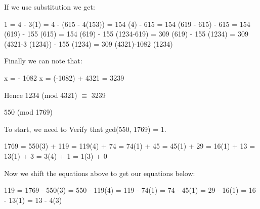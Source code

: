 \documentclass[12pt,letterpaper,final]{report}
\begin{document}
If we use substitution we get: \newline

1 = 4 - 3(1)   = 4 - (615 - 4(153))   =  154 (4) - 615  = 154 (619 - 615) - 615  = 154 (619) - 155 (615)  = 154 (619) - 155 (1234-619)  = 309 (619) - 155 (1234)  = 309 (4321-3 (1234)) - 155 (1234)  = 309 (4321)-1082 (1234) \newline

Finally we can note that: \newline

x = - 1082 \newline
x = (-1082) + 4321 = 3239 \newline


Hence  $1234$ (mod 4321) $\equiv$ 3239 \newline

\bigskip

$550$ (mod 1769)  \newline

To start, we need to Verify that gcd(550, 1769) = 1. \newline

1769 = 550(3) + 119  = 119(4) + 74	  = 74(1) + 45	  = 45(1) + 29	  = 16(1) + 13	  = 13(1) + 3	  = 3(4) + 1	  = 1(3) + 0 \newline

Now we shift the equations above to get our equations below: \newline

119 = 1769 - 550(3)  = 550 - 119(4)  = 119 - 74(1)  = 74 - 45(1)  = 29 - 16(1)  = 16 - 13(1)  = 13 - 4(3) \newline
\end{document}
